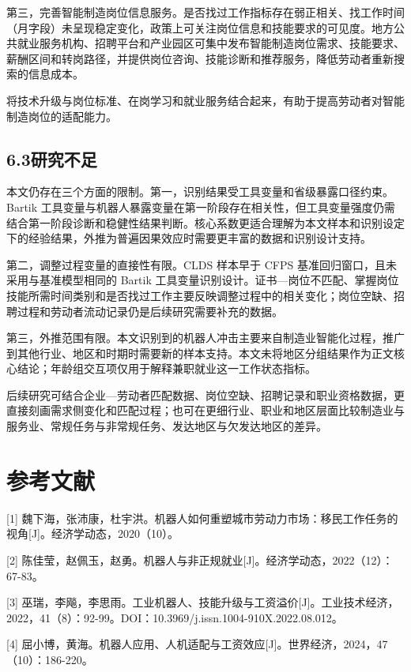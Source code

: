 第三，完善智能制造岗位信息服务。是否找过工作指标存在弱正相关、找工作时间（月字段）未呈现稳定变化，政策上可关注岗位信息和技能要求的可见度。地方公共就业服务机构、招聘平台和产业园区可集中发布智能制造岗位需求、技能要求、薪酬区间和转岗路径，并提供岗位咨询、技能诊断和推荐服务，降低劳动者重新搜索的信息成本。

将技术升级与岗位标准、在岗学习和就业服务结合起来，有助于提高劳动者对智能制造岗位的适配能力。

\subsection{6.3研究不足}\label{ux7814ux7a76ux4e0dux8db3}

本文仍存在三个方面的限制。第一，识别结果受工具变量和省级暴露口径约束。Bartik 工具变量与机器人暴露变量在第一阶段存在相关性，但工具变量强度仍需结合第一阶段诊断和稳健性结果判断。核心系数更适合理解为本文样本和识别设定下的经验结果，外推为普遍因果效应时需要更丰富的数据和识别设计支持。

第二，调整过程变量的直接性有限。CLDS 样本早于 CFPS 基准回归窗口，且未采用与基准模型相同的 Bartik 工具变量识别设计。证书---岗位不匹配、掌握岗位技能所需时间类别和是否找过工作主要反映调整过程中的相关变化；岗位空缺、招聘过程和劳动者流动记录仍是后续研究需要补充的数据。

第三，外推范围有限。本文识别到的机器人冲击主要来自制造业智能化过程，推广到其他行业、地区和时期时需要新的样本支持。本文未将地区分组结果作为正文核心结论；年龄组交互项仅用于解释兼职就业这一工作状态指标。

后续研究可结合企业---劳动者匹配数据、岗位空缺、招聘记录和职业资格数据，更直接刻画需求侧变化和匹配过程；也可在更细行业、职业和地区层面比较制造业与服务业、常规任务与非常规任务、发达地区与欠发达地区的差异。

\section{参考文献}\label{ux53c2ux8003ux6587ux732e}

{[}1{]} 魏下海，张沛康，杜宇洪。机器人如何重塑城市劳动力市场：移民工作任务的视角{[}J{]}。经济学动态，2020（10）。

{[}2{]} 陈佳莹，赵佩玉，赵勇。机器人与非正规就业{[}J{]}。经济学动态，2022（12）：67-83。

{[}3{]} 巫瑞，李飚，李思雨。工业机器人、技能升级与工资溢价{[}J{]}。工业技术经济，2022，41（8）：92-99。DOI：10.3969/j.issn.1004-910X.2022.08.012。

{[}4{]} 屈小博，黄海。机器人应用、人机适配与工资效应{[}J{]}。世界经济，2024，47（10）：186-220。

